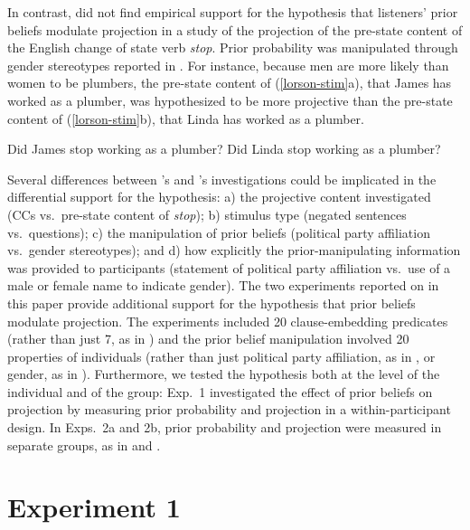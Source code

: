 \documentclass[11pt,fleqn]{article}
\newcommand{\6}{\mbox{$[\hspace*{-.6mm}[$}}
\newcommand{\9}{\mbox{$]\hspace*{-.6mm}]$}}
\newcommand{\citeposs}[1]{\citeauthor{#1}'s}
\begin{document}
In contrast,  did not find empirical support for the hypothesis that listeners' prior beliefs modulate projection %
in a study of the projection of the pre-state content of the English change of state verb {\em stop}. Prior probability was manipulated through gender stereotypes reported in . For instance, because men are more likely than women to be plumbers, the pre-state content of (\ref{lorson-stim}a), that James has worked as a plumber, was hypothesized to be more projective than the pre-state content of (\ref{lorson-stim}b), that Linda has worked as a plumber.

\begin{exe}
\ex\label{lorson-stim} 
\begin{xlist}
\ex Did James stop working as a plumber?
\ex Did Linda stop working as a plumber? \hfill \cite[38]{lorson2018}
\end{xlist}
\end{exe}

Several differences between \citeposs{mahler2020} and \citeposs{lorson2018} investigations could be implicated in the differential support for the hypothesis: a) the projective content investigated (CCs vs.\ pre-state content of {\em stop}); b) stimulus type (negated sentences vs.\ questions); c) the manipulation of prior beliefs (political party affiliation vs.\ gender stereotypes); and d) how explicitly the prior-manipulating information was provided to participants (statement of political party affiliation vs.\  use of a male or female name to indicate gender). The two experiments reported on in this paper provide additional support for the hypothesis that prior beliefs modulate projection. The experiments included 20 clause-embedding predicates (rather than just 7, as in ) and the prior belief manipulation involved 20 properties of individuals (rather than just political party affiliation, as in , or gender, as in ). Furthermore, we tested the hypothesis both at the level of the individual and of the group: Exp.~1 investigated the effect of prior beliefs on projection by measuring prior probability and projection in a within-participant design. In Exps.~2a and 2b, prior probability and projection were measured in separate groups, as in  and . 

\section{Experiment 1}\label{s2}
\end{document}
